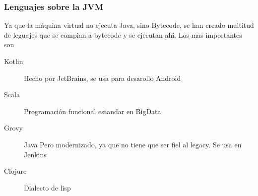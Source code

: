    \subsubsection{Lenguajes sobre la JVM}
        Ya que la máquina virtual no ejecuta Java, sino Bytecode, se han creado multitud de leguajes que se compian a bytecode y se ejecutan ahí. Los mas importantes son
        \begin{description}
            \item[Kotlin] Hecho por JetBrains, se usa para desarollo Android
            \item[Scala] Programación funcional estandar en BigData
            \item[Grovy] Java Pero modernizado, ya que no tiene que ser fiel al legacy. Se usa en Jenkins
            \item[Clojure] Dialecto de lisp
        \end{description}